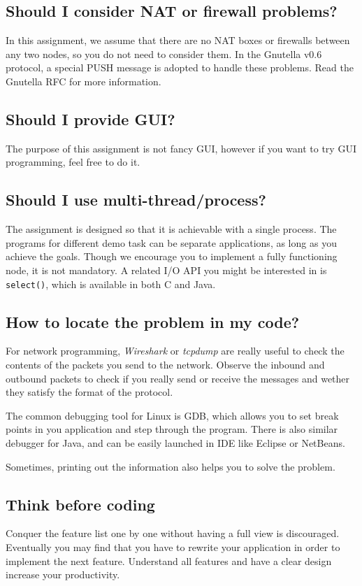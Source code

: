 \documentclass[12pt, a4paper]{article}
\begin{document}
\subsection*{Should I consider NAT or firewall problems?}
In this assignment, we assume that there are no NAT boxes or firewalls between any two nodes, so you do not need to consider them.
In the Gnutella v0.6 protocol, a special PUSH message is adopted to handle these problems.
Read the Gnutella RFC for more information.

\subsection*{Should I provide GUI?}
The purpose of this assignment is not fancy GUI, however if you want to try GUI programming, feel free to do it.

\subsection*{Should I use multi-thread/process?}
The assignment is designed so that it is achievable with a single process.
The programs for different demo task can be separate applications, as long as you achieve the goals.
Though we encourage you to implement a fully functioning node, it is not mandatory.
A related I/O API you might be interested in is \texttt{select()}, which is available in both C and Java.

\subsection*{How to locate the problem in my code?}
For network programming, \emph{Wireshark} or \emph{tcpdump} are really useful to check the contents of the packets you send to the network.
Observe the inbound and outbound packets to check if you really send or receive the messages and wether they satisfy the format of the protocol.

The common debugging tool for Linux is GDB, which allows you to set break points in you application and step through the program.
There is also similar debugger for Java, and can be easily launched in IDE like Eclipse or NetBeans.

Sometimes, printing out the information also helps you to solve the problem.

\subsection*{Think before coding}
Conquer the feature list one by one without having a full view is discouraged.
Eventually you may find that you have to rewrite your application in order to implement the next feature.
Understand all features and have a clear design increase your productivity.
\end{document}
